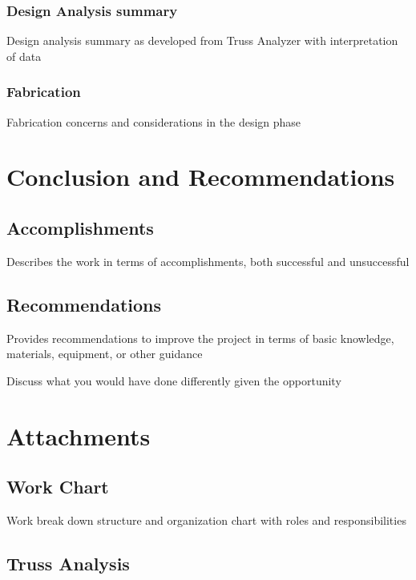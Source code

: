 \documentclass{article}
\let\Oldsection\section
\renewcommand{\section}{\FloatBarrier\Oldsection}
\let\Oldsubsection\subsection
\renewcommand{\subsection}{\FloatBarrier\Oldsubsection}
\let\Oldsubsubsection\subsubsection
\renewcommand{\subsubsection}{\FloatBarrier\Oldsubsubsection}
\begin{document}
  \subsubsection{Design Analysis summary}

  Design analysis summary as developed from Truss Analyzer with interpretation of data

  \subsubsection{Fabrication}

  Fabrication concerns and considerations in the design phase

  \newpage

  \section{Conclusion and Recommendations}

  \subsection{Accomplishments}

  Describes the work in terms of accomplishments, both successful and unsuccessful

  \subsection{Recommendations}

  Provides recommendations to improve the project in terms of basic knowledge, materials, equipment, or other guidance

  Discuss what you would have done differently given the opportunity

  \newpage

  \section{Attachments}

  \subsection{Work Chart}

  Work break down structure and organization chart with roles and responsibilities

  \newpage

  \subsection{Truss Analysis}
\end{document}
